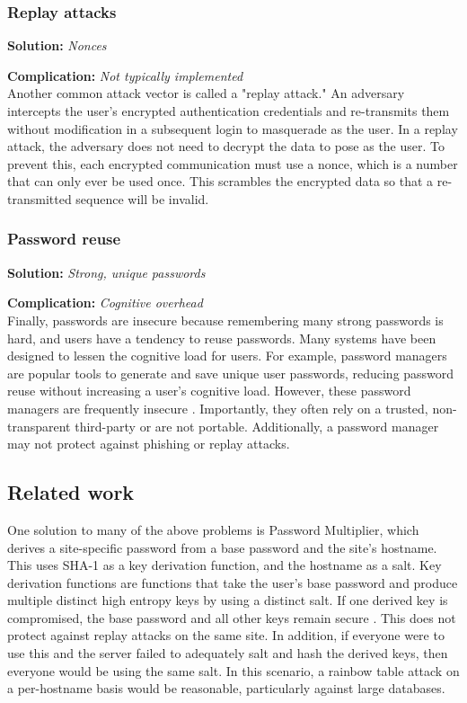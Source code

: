 \subsubsection{Replay attacks}

\textbf{Solution:} \emph{Nonces}

\noindent\textbf{Complication:} \emph{Not typically implemented}\\

Another common attack vector is called a "replay attack." An adversary intercepts the user's encrypted authentication credentials and re-transmits them without modification in a subsequent login to masquerade as the user. In a replay attack, the adversary does not need to decrypt the data to pose as the user. To prevent this, each encrypted communication must use a nonce, which is a number that can only ever be used once. This scrambles the encrypted data so that a re-transmitted sequence will be invalid.


\subsubsection{Password reuse}

\textbf{Solution:} \emph{Strong, unique passwords}

\noindent\textbf{Complication:} \emph{Cognitive overhead}\\

Finally, passwords are insecure because remembering many strong passwords is hard, and users have a tendency to reuse passwords. Many systems have been designed to lessen the cognitive load for users. For example, password managers are popular tools to generate and save unique user passwords, reducing password reuse without increasing a user's cognitive load. However, these password managers are frequently insecure \cite{Li:2014}. Importantly, they often rely on a trusted, non-transparent third-party or are not portable. Additionally, a password manager may not protect against phishing or replay attacks.

\subsection{Related work}

One solution to many of the above problems is Password Multiplier, which derives a site-specific password from a base password and the site's hostname. This uses SHA-1 as a key derivation function, and the hostname as a salt. Key derivation functions are functions that take the user's base password and produce multiple distinct high entropy keys by using a distinct salt. If one derived key is compromised, the base password and all other keys remain secure \cite{Halderman:2005}. This does not protect against replay attacks on the same site. In addition, if everyone were to use this and the server failed to adequately salt and hash the derived keys, then everyone would be using the same salt. In this scenario, a rainbow table attack on a per-hostname basis would be reasonable, particularly against large databases.

